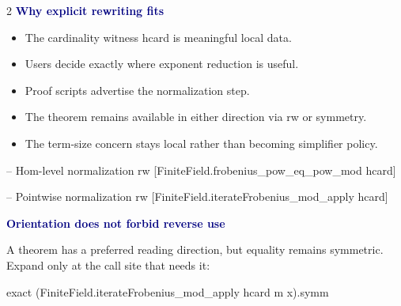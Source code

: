\documentclass[10pt]{article}
\newenvironment{lean}{\Verbatim[fontsize=\small,frame=single,framesep=1.8mm,rulecolor=\color{blue!45},formatcom=\leanfont]}{\endVerbatim}
\newcommand{\code}[1]{{\leanfont #1}}
\newcommand{\decision}[1]{\textcolor{navy}{\bfseries #1}}
\begin{document}
\begin{multicols}{2}
\decision{Why explicit rewriting fits}
\begin{itemize}
\item The cardinality witness \code{hcard} is meaningful local data.
\item Users decide exactly where exponent reduction is useful.
\item Proof scripts advertise the normalization step.
\item The theorem remains available in either direction via \code{rw} or symmetry.
\item The term-size concern stays local rather than becoming simplifier policy.
\end{itemize}

\begin{lean}
-- Hom-level normalization
rw [FiniteField.frobenius_pow_eq_pow_mod hcard]

-- Pointwise normalization
rw [FiniteField.iterateFrobenius_mod_apply hcard]
\end{lean}

\columnbreak
\decision{Orientation does not forbid reverse use}

A theorem has a preferred reading direction, but equality remains symmetric.  Expand only at the call site that needs it:

\begin{lean}
exact
  (FiniteField.iterateFrobenius_mod_apply
    hcard m x).symm
\end{lean}

\begin{center}
\end{center}

\end{multicols}
\end{document}
